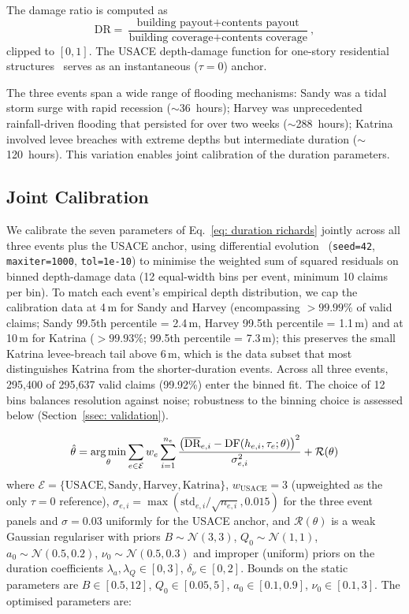 The damage ratio is computed as \[\text{DR} = \frac{\text{building payout} + \text{contents payout}}{\text{building coverage} + \text{contents coverage}},\] clipped to $[0, 1]$. The USACE depth-damage function for one-story residential structures~\cite{usace2003} serves as an instantaneous ($\tau = 0$) anchor.

The three events span a wide range of flooding mechanisms: Sandy was a tidal storm surge with rapid recession ($\sim$36~hours); Harvey was unprecedented rainfall-driven flooding that persisted for over two weeks ($\sim$288~hours); Katrina involved levee breaches with extreme depths but intermediate duration ($\sim$120~hours). This variation enables joint calibration of the duration parameters.

\subsection{Joint Calibration}
\label{ssec: joint calibration}

We calibrate the seven parameters of Eq.~\ref{eq: duration richards} jointly across all three events plus the USACE anchor, using differential evolution~\cite{storn1997differential} (\texttt{seed=42}, \texttt{maxiter=1000}, \texttt{tol=1e-10}) to minimise the weighted sum of squared residuals on binned depth-damage data (12 equal-width bins per event, minimum 10 claims per bin). To match each event's empirical depth distribution, we cap the calibration data at 4\,m for Sandy and Harvey (encompassing $>99.99\%$ of valid claims; Sandy 99.5th percentile = 2.4\,m, Harvey 99.5th percentile = 1.1\,m) and at 10\,m for Katrina ($>99.93\%$; 99.5th percentile = 7.3\,m); this preserves the small Katrina levee-breach tail above 6\,m, which is the data subset that most distinguishes Katrina from the shorter-duration events. Across all three events, 295{,}400 of 295{,}637 valid claims (99.92\%) enter the binned fit. The choice of 12 bins balances resolution against noise; robustness to the binning choice is assessed below (Section~\ref{ssec: validation}).

\begin{equation*}
    \hat{\theta} = \operatorname*{arg\,min}_\theta \sum_{e \in \mathcal{E}} w_e \sum_{i=1}^{n_e} \frac{\left(\overline{\text{DR}}_{e,i} - \text{DF}(h_{e,i}, \tau_e; \theta)\right)^2}{\sigma_{e,i}^2} + \mathcal{R}(\theta)
\end{equation*}
%
where $\mathcal{E} = \{\text{USACE}, \text{Sandy}, \text{Harvey}, \text{Katrina}\}$, $w_{\text{USACE}} = 3$ (upweighted as the only $\tau = 0$ reference), $\sigma_{e,i} = \max(\text{std}_{e,i} / \sqrt{n_{e,i}}, 0.015)$ for the three event panels and $\sigma = 0.03$ uniformly for the USACE anchor, and $\mathcal{R}(\theta)$ is a weak Gaussian regulariser with priors $B \sim \mathcal{N}(3, 3)$, $Q_0 \sim \mathcal{N}(1, 1)$, $a_0 \sim \mathcal{N}(0.5, 0.2)$, $\nu_0 \sim \mathcal{N}(0.5, 0.3)$ and improper (uniform) priors on the duration coefficients $\lambda_a, \lambda_Q \in [0, 3]$, $\delta_\nu \in [0, 2]$. Bounds on the static parameters are $B \in [0.5, 12]$, $Q_0 \in [0.05, 5]$, $a_0 \in [0.1, 0.9]$, $\nu_0 \in [0.1, 3]$. The optimised parameters are:

